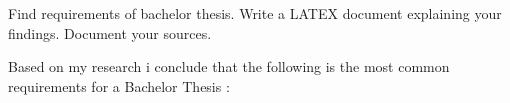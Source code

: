 \begin{displayquote}
Find requirements of bachelor thesis. Write a LATEX document explaining your
findings. Document your sources.
\end{displayquote}

Based on my research i conclude that the following is the most common requirements for a Bachelor Thesis \cite{guidelines-for-writing-your-thesis-report}\cite{get-thesis-how-to-write-a-winning-bachelor-thesis}\cite{oxford-thesis}: